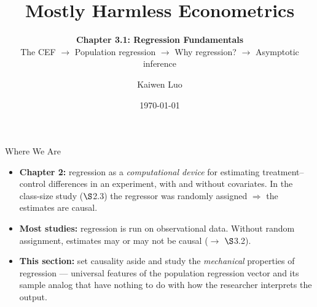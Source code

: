 \documentclass[aspectratio=169,11pt]{beamer}
\title{Mostly Harmless Econometrics}
\subtitle{
\textbf{Chapter 3.1: Regression Fundamentals}
\\[0.55em]
The CEF
$\rightarrow$ Population regression
$\rightarrow$ Why regression?
$\rightarrow$ Asymptotic inference
}
\author{Kaiwen Luo}
\institute{Washington University in St.Louis}
\date{\today}
\newcommand{\NoHyph}{\hyphenpenalty=10000\exhyphenpenalty=10000\relax}
\newcommand{\E}{\mathbb{E}}
\newcommand{\Sec}{\ensuremath{\S}}
\begin{document}
\begin{frame}
    \titlepage
\end{frame}


\begin{frame}{Where We Are}
\small

\begin{itemize}
    \item \textbf{Chapter 2:} regression as a \emph{computational device} for
    estimating treatment--control differences in an experiment, with and
    without covariates. In the class-size study (\Sec{}2.3) the regressor was
    randomly assigned $\Rightarrow$ the estimates are causal.
    \item \textbf{Most studies:} regression is run on \alert{observational data}.
    Without random assignment, estimates may or may not be causal
    ($\rightarrow$ \Sec{}3.2).
    \item \textbf{This section:} set causality aside and study the
    \emph{mechanical} properties of regression --- universal features of the
    population regression vector and its sample analog that have nothing to
    do with how the researcher interprets the output.
\end{itemize}

\medskip

\begin{center}
\end{center}

\end{frame}
\end{document}
